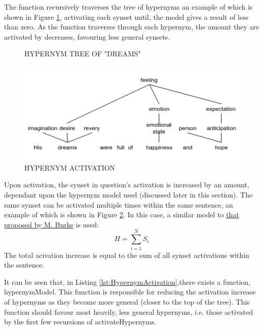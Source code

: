 \documentclass[]{article}
\begin{document}
The function recursively traverses the tree of hypernyms an example of which is shown in Figure \ref{fig:hypernymTree}, activating each synset until, the model gives a result of less than zero. As the function traverses through each hypernym, the amount they are activated by decreases, favouring less general synsets.

\begin{figure}[h]
\caption{HYPERNYM TREE OF "DREAMS"}
\label{fig:hypernymTree}
\end{figure}

\begin{figure}[h]
	\includegraphics[scale=0.6]{HypernymActivation.png}
	\caption{HYPERNYM ACTIVATION}
	\label{fig:HypernymAct}
\end{figure}

Upon activation, the synset in question's activation is increased by an amount, dependant upon the hypernym model used (discussed later in this section). The same synset can be activated multiple times within the same sentence, an example of which is shown in Figure \ref{fig:HypernymAct}. In this case, a similar model to \hyperref[sec:MattBurke]{that proposed by M. Burke} \cite{MattBurkePrevious} is used: 
\[H = \sum\limits_{i=1}^N S_i\] 
The total acivation increase is equal to the sum of all synset activations within the sentence. 

It can be seen that, in Listing \ref{lst:HypernymActivation},there exists a function, hypernymModel. This function is responsible for reducing the activation increase of hypernyms as they become more general (closer to the top of the tree). This function should favour most heavily, less general hypernyms, i.e. those activated by the first few recursions of activateHypernyms. 
\end{document}
